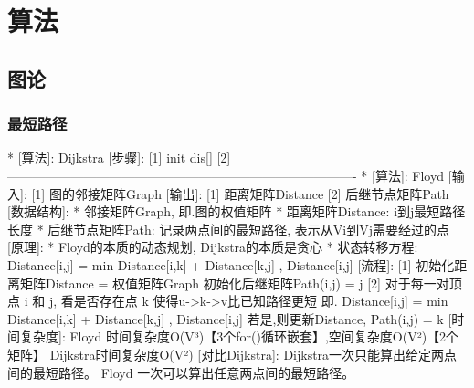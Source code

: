 \documentclass{article}
\title{}\date{} \setlength{\parindent}{0pt} \linespread{1.25}
\begin{document}
\tableofcontents

\section{算法}
    \subsection{图论}

        \subsubsection{最短路径}
        *	[算法]: Dijkstra
                [步骤]:
                    [1] init dis[]
                    [2] 
        ----------------------------------------------------------------------------------
        *	[算法]: Floyd
                [输入]:	[1] 图的邻接矩阵Graph
                [输出]: [1] 距离矩阵Distance	[2] 后继节点矩阵Path
                [数据结构]:
                    * 邻接矩阵Graph, 即.图的权值矩阵
                    * 距离矩阵Distance: i到j最短路径长度
                    * 后继节点矩阵Path: 记录两点间的最短路径, 表示从Vi到Vj需要经过的点
                [原理]:
                    * Floyd的本质的动态规划, Dijkstra的本质是贪心
                    * 状态转移方程:
                        Distance[i,j] = min{ Distance[i,k] + Distance[k,j] , Distance[i,j] }
                [流程]:
                    [1] 初始化距离矩阵Distance = 权值矩阵Graph
                        初始化后继矩阵Path(i,j) = j
                    [2] 对于每一对顶点 i 和 j, 看是否存在点 k 使得u->k->v比已知路径更短
                            即. Distance[i,j] = min{ Distance[i,k] + Distance[k,j] , Distance[i,j] }
                        若是,则更新Distance, Path(i,j) = k
                [时间复杂度]:
                    Floyd	时间复杂度O(V³)【3个for()循环嵌套】,空间复杂度O(V²)【2个矩阵】
                    Dijkstra时间复杂度O(V²)
                [对比Dijkstra]:
                    Dijkstra一次只能算出给定两点间的最短路径。
                    Floyd   一次可以算出任意两点间的最短路径。
\end{document}
